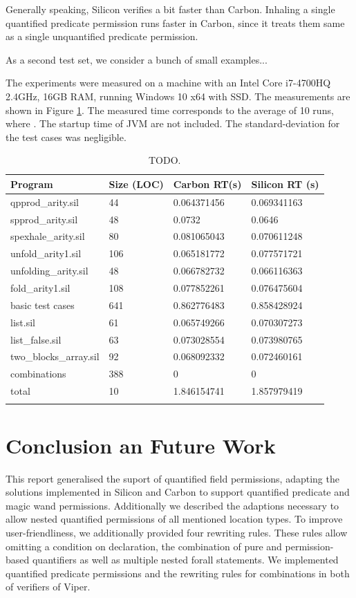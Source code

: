 \documentclass[12pt]{article}
\begin{document}
Generally speaking, Silicon verifies a bit faster than Carbon. Inhaling a single quantified predicate permission runs faster in Carbon, since it treats them same as a single unquantified predicate permission.

As a second test set, we consider a bunch of small examples...

The experiments were measured on a machine with an Intel Core i7-4700HQ 2.4GHz, 16GB RAM, running Windows 10 x64 with SSD. The measurements are shown in Figure \ref{timings}. The measured time corresponds to the average of 10 runs, where . The startup time of JVM are not included. The standard-deviation for the test cases was negligible.

\begin{longtable}{ | p{} | p{}| p{} | p{}|}
\hline
{\bf Program} & {\bf Size (LOC)} & {\bf Carbon RT(s) }&  {\bf Silicon RT (s)} \\ \hline
qpprod\_arity.sil & 44 & 0.064371456 & 0.069341163\\
spprod\_arity.sil & 48 & 0.0732 & 0.0646 \\
spexhale\_arity.sil & 80 & 0.081065043 & 0.070611248 \\
unfold\_arity1.sil & 106 & 0.065181772 & 0.077571721\\
unfolding\_arity.sil & 48 & 0.066782732 & 0.066116363\\
fold\_arity1.sil & 108 & 0.077852261 & 0.076475604 \\
\hline
basic test cases & 641 & 0.862776483 & 0.858428924
\\
\hline
list.sil & 61 & 0.065749266 & 0.070307273\\
list\_false.sil & 63 & 0.073028554 & 0.073980765\\
two\_blocks\_array.sil & 92 & 0.068092332 & 0.072460161\\
\hline combinations & 388 & 0 & 0\\
\hline \hline
total & 10 & 1.846154741 & 1.857979419\\
\hline
\caption[run-time measurements]
   {TODO.}
\label{timings}
\end{longtable}

\section{Conclusion an Future Work}
This report generalised the suport of quantified field permissions, adapting the solutions implemented in Silicon and Carbon to support quantified predicate and magic wand permissions. Additionally we described the adaptions necessary to allow nested quantified permissions of all mentioned location types. To improve user-friendliness, we additionally provided four rewriting rules. These rules allow omitting a condition on declaration, the combination of pure and permission-based quantifiers as well as multiple nested forall statements. We implemented quantified predicate permissions and the rewriting rules for combinations in both of verifiers of Viper.
\end{document}
